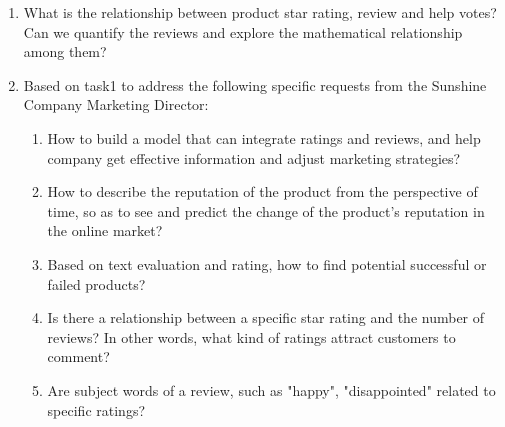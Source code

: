 \documentclass{mcmthesis}
\begin{document}
\begin{enumerate}
	\item What is the relationship between product star rating, review and help votes? Can we quantify the reviews and explore the mathematical relationship among them?
	\item Based on task1 to address the following specific requests from the Sunshine Company Marketing Director:
	\begin{enumerate}
	\item How to build a model that can integrate ratings and reviews, and help company get effective information and adjust marketing strategies?
	\item How to describe the reputation of the product from the perspective of time, so as to see and predict the change of the product's reputation in the online market?
	\item Based on text evaluation and rating, how to find potential successful or failed products?
	\item Is there a relationship between a specific star rating and the number of reviews? In other words, what kind of ratings attract customers to comment?
	\item Are subject words of a review, such as "happy", "disappointed" related to specific ratings?
	\end{enumerate}
\end{enumerate}

%
%
\end{document}
